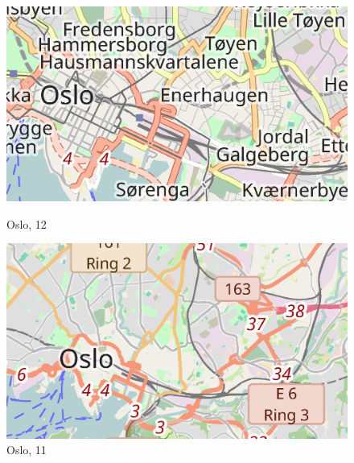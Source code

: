 \documentclass[../main/thesis.tex]{subfiles}
\begin{document}


\begin{figure}[ht]
  \begin{minipage}[t]{.5\linewidth}
    \centering
    \includegraphics[width=\ScaleIfNeeded]{../chapter2/kampen-z12}
    \caption{Oslo,  12}\label{fig:kampen12}
  \end{minipage}%
  \begin{minipage}[t]{.5\linewidth}
    \centering
    \includegraphics[width=\ScaleIfNeeded]{../chapter2/kampen-z11}
    \caption{Oslo,  11}\label{fig:kampen11}
  \end{minipage}
\end{figure}

\end{document}
